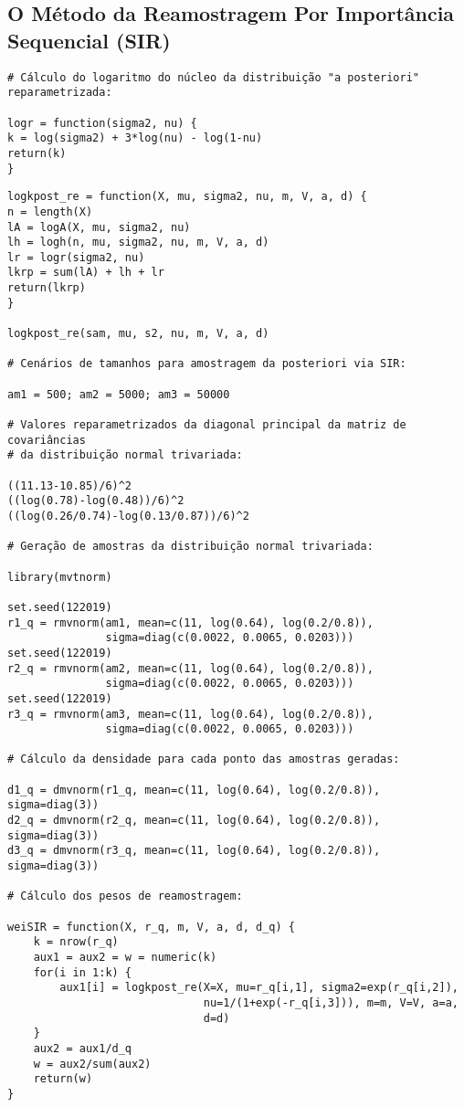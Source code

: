 \documentclass[12pt,reqno,a4paper,oneside]{article}
\begin{document}
\subsection*{O Método da Reamostragem Por Importância Sequencial (SIR)}

\begin{verbatim}
# Cálculo do logaritmo do núcleo da distribuição "a posteriori" reparametrizada:

logr = function(sigma2, nu) {
k = log(sigma2) + 3*log(nu) - log(1-nu)
return(k)
}
\end{verbatim}

\newpage

\begin{verbatim}
logkpost_re = function(X, mu, sigma2, nu, m, V, a, d) {
n = length(X)
lA = logA(X, mu, sigma2, nu)
lh = logh(n, mu, sigma2, nu, m, V, a, d)
lr = logr(sigma2, nu)
lkrp = sum(lA) + lh + lr
return(lkrp)
}

logkpost_re(sam, mu, s2, nu, m, V, a, d)

# Cenários de tamanhos para amostragem da posteriori via SIR:

am1 = 500; am2 = 5000; am3 = 50000

# Valores reparametrizados da diagonal principal da matriz de covariâncias
# da distribuição normal trivariada:

((11.13-10.85)/6)^2
((log(0.78)-log(0.48))/6)^2
((log(0.26/0.74)-log(0.13/0.87))/6)^2

# Geração de amostras da distribuição normal trivariada:

library(mvtnorm)

set.seed(122019)
r1_q = rmvnorm(am1, mean=c(11, log(0.64), log(0.2/0.8)),
			   sigma=diag(c(0.0022, 0.0065, 0.0203)))
set.seed(122019)
r2_q = rmvnorm(am2, mean=c(11, log(0.64), log(0.2/0.8)),
			   sigma=diag(c(0.0022, 0.0065, 0.0203)))
set.seed(122019)
r3_q = rmvnorm(am3, mean=c(11, log(0.64), log(0.2/0.8)),
			   sigma=diag(c(0.0022, 0.0065, 0.0203)))

# Cálculo da densidade para cada ponto das amostras geradas:

d1_q = dmvnorm(r1_q, mean=c(11, log(0.64), log(0.2/0.8)), sigma=diag(3))
d2_q = dmvnorm(r2_q, mean=c(11, log(0.64), log(0.2/0.8)), sigma=diag(3))
d3_q = dmvnorm(r3_q, mean=c(11, log(0.64), log(0.2/0.8)), sigma=diag(3))

# Cálculo dos pesos de reamostragem:

weiSIR = function(X, r_q, m, V, a, d, d_q) {
	k = nrow(r_q)
	aux1 = aux2 = w = numeric(k)
	for(i in 1:k) {
		aux1[i] = logkpost_re(X=X, mu=r_q[i,1], sigma2=exp(r_q[i,2]),
							  nu=1/(1+exp(-r_q[i,3])), m=m, V=V, a=a,
							  d=d)
	}
	aux2 = aux1/d_q
	w = aux2/sum(aux2)
	return(w)
}


\end{verbatim}
\end{document}
